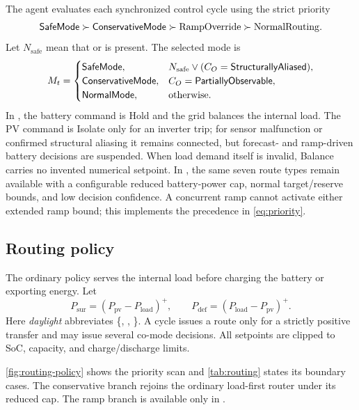 The agent evaluates each synchronized control cycle using the strict priority
\begin{equation}
\label{eq:priority}
\textsf{SafeMode}\succ
\textsf{ConservativeMode}\succ
\mathrm{RampOverride}\succ
\mathrm{NormalRouting}.
\end{equation}
Let $N_{\mathrm{safe}}$ mean that  or  is present. The selected mode is
\begin{equation}
\label{eq:mode-selection}
M_t=
\begin{cases}
\textsf{SafeMode}, & N_{\mathrm{safe}}\vee
(C_O=\textsf{StructurallyAliased}),\\
\textsf{ConservativeMode}, & C_O=\textsf{PartiallyObservable},\\
\textsf{NormalMode}, & \text{otherwise}.
\end{cases}
\end{equation}
In , the battery command is Hold and the grid balances the internal load. The PV command is Isolate only for an inverter trip; for sensor malfunction or confirmed structural aliasing it remains connected, but forecast- and ramp-driven battery decisions are suspended. When load demand itself is invalid, Balance carries no invented numerical setpoint. In , the same seven route types remain available with a configurable reduced battery-power cap, normal target/reserve bounds, and low decision confidence. A concurrent ramp cannot activate either extended ramp bound; this implements the precedence in \autoref{eq:priority}.

\subsection{Routing policy}

The ordinary policy serves the internal load before charging the battery or exporting energy. Let
\begin{equation}
\label{eq:surplus-deficit}
P_{\mathrm{sur}}=(P_{\mathrm{pv}}-P_{\mathrm{load}})^{+},
\qquad
P_{\mathrm{def}}=(P_{\mathrm{load}}-P_{\mathrm{pv}})^{+}.
\end{equation}
Here \emph{daylight} abbreviates \{, , \}. A cycle issues a route only for a strictly positive transfer and may issue several co-mode decisions. All setpoints are clipped to SoC, capacity, and charge/discharge limits.

\autoref{fig:routing-policy} shows the priority scan and \autoref{tab:routing} states its boundary cases. The conservative branch rejoins the ordinary load-first router under its reduced cap. The ramp branch is available only in .

